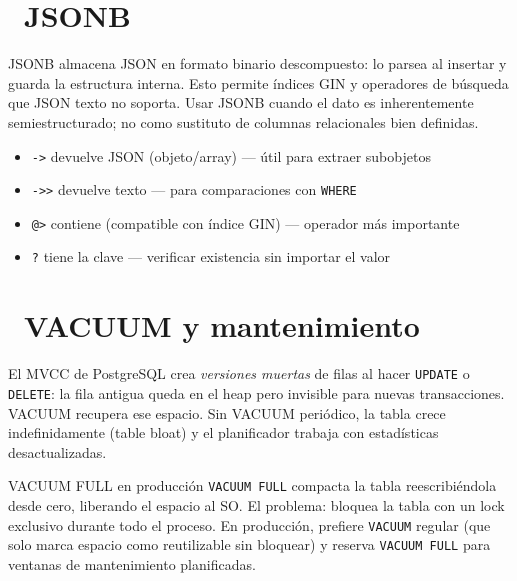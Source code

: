 \section[JSONB]{~JSONB}

JSONB almacena JSON en formato binario descompuesto: lo parsea al insertar y guarda la estructura interna.
Esto permite índices GIN y operadores de búsqueda que JSON texto no soporta.
Usar JSONB cuando el dato es inherentemente semiestructurado; no como sustituto de columnas relacionales bien definidas.

\begin{itemize}
  \item \texttt{->} devuelve JSON (objeto/array) --- útil para extraer subobjetos
  \item \texttt{->>} devuelve texto --- para comparaciones con \texttt{WHERE}
  \item \texttt{@>} contiene (compatible con índice GIN) --- operador más importante
  \item \texttt{?} tiene la clave --- verificar existencia sin importar el valor
\end{itemize}

\section[VACUUM y mantenimiento]{~VACUUM y mantenimiento}

El MVCC de PostgreSQL crea \emph{versiones muertas} de filas al hacer \texttt{UPDATE} o \texttt{DELETE}: la fila antigua queda en el heap pero invisible para nuevas transacciones.
VACUUM recupera ese espacio. Sin VACUUM periódico, la tabla crece indefinidamente (table bloat) y el planificador trabaja con estadísticas desactualizadas.

\begin{warningbox}{VACUUM FULL en producción}
\texttt{VACUUM FULL} compacta la tabla reescribiéndola desde cero, liberando el espacio al SO.
El problema: bloquea la tabla con un lock exclusivo durante todo el proceso.
En producción, prefiere \texttt{VACUUM} regular (que solo marca espacio como reutilizable sin bloquear) y reserva \texttt{VACUUM FULL} para ventanas de mantenimiento planificadas.
\end{warningbox}

